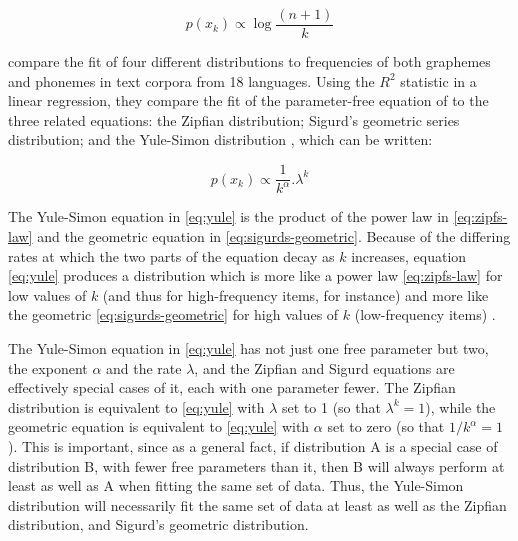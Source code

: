 \begin{equation}
p(x_k) \propto \log \frac{(n+1)}{k}
\label{eq:borodovsky-rank-dist}
\end{equation}

\textcite{martindale_comparison_1996} compare the fit of four different distributions to frequencies of both graphemes and phonemes in text corpora from 18 languages. Using the \(R^2\) statistic in a linear regression, they compare the fit of the parameter-free equation of \textcite{borodovsky_general_1989} to the three related equations: the Zipfian distribution; Sigurd's geometric series distribution; and the Yule-Simon distribution \autocites{yule_mathematical_1925}{simon_class_1955}, which can be written:

\begin{equation}
p(x_k) \propto \frac{1}{k^\alpha}.\lambda^k
\label{eq:yule}
\end{equation}

The Yule-Simon equation in \eqref{eq:yule} is the product of the power law in \eqref{eq:zipfs-law} and the geometric equation in \eqref{eq:sigurds-geometric}. Because of the differing rates at which the two parts of the equation decay as \(k\) increases, equation \eqref{eq:yule} produces a distribution which is more like a power law \eqref{eq:zipfs-law} for low values of \(k\) (and thus for high-frequency items, for instance) and more like the geometric \eqref{eq:sigurds-geometric} for high values of \(k\) (low-frequency items) \autocite{simon_class_1955}.

The Yule-Simon equation in \eqref{eq:yule} has not just one free parameter but two, the exponent \(\alpha\) and the rate \(\lambda\), and the Zipfian and Sigurd equations are effectively special cases of it, each with one parameter fewer. The Zipfian distribution is equivalent to \eqref{eq:yule} with \(\lambda\) set to 1 (so that \(\lambda^k = 1\)), while the geometric equation is equivalent to \eqref{eq:yule} with \(\alpha\) set to zero (so that \(1/k^\alpha = 1\)). This is important, since as a general fact, if distribution A is a special case of distribution B, with fewer free parameters than it, then B will always perform at least as well as A when fitting the same set of data. Thus, the Yule-Simon distribution will necessarily fit the same set of data at least as well as the Zipfian distribution, and Sigurd's geometric distribution.

